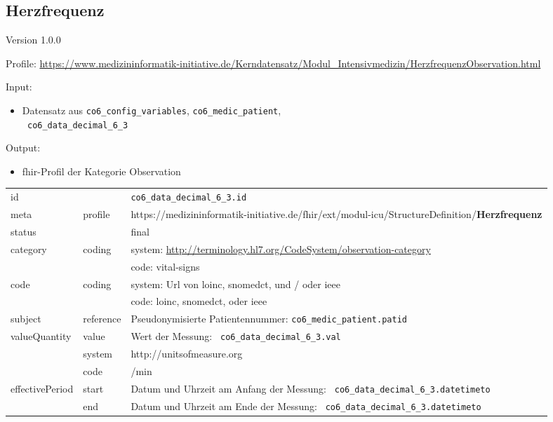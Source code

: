 \subsection{Herzfrequenz} 
\noindent Version 1.0.0

\noindent Profile: \url{https://www.medizininformatik-initiative.de/Kerndatensatz/Modul_Intensivmedizin/HerzfrequenzObservation.html}

\noindent Input:
\begin{itemize}
	\item Datensatz aus \texttt{co6\_config\_variables}, \texttt{co6\_medic\_patient}, \\ \texttt{
co6\_data\_decimal\_6\_3}
\end{itemize}
Output:
\begin{itemize}
        \item \ac{fhir}-Profil der Kategorie \glqq Observation\grqq{}
\end{itemize}
\begin{longtable}{|l|l|p{7.5cm}|}
        \hline
        \rowcolor{lightgray} \multicolumn{3}{|l|}{Data Mapping (inhaltlich)} \\ \hline
        id &  & \texttt{co6\_data\_decimal\_6\_3.id} \\ \hline
	meta & profile & https://medizininformatik-initiative.de/fhir/ext/modul-icu/StructureDefinition/\textbf{Herzfrequenz} \\ \hline 
	status &  & final  \\ \hline 
	category & coding & system: \url{http://terminology.hl7.org/CodeSystem/observation-category} \\
\cline{3-3}
	& & code: vital-signs\\ \hline
	code & coding & system: Url von \ac{loinc}, \ac{snomedct}, und / oder \ac{ieee} \\ 
	\cline{3-3} 
	 &  & code: \ac{loinc}, \ac{snomedct}, oder \ac{ieee} \\ \hline
	subject & reference & Pseudonymisierte Patientennummer: \texttt{co6\_medic\_patient.patid} \\ \hline
	valueQuantity & value & Wert der Messung: \texttt{
co6\_data\_decimal\_6\_3.val} \\
        \cline{2-3}
         & system & http://unitsofmeasure.org \\
         \cline{2-3}
         & code & /min \\ \hline
    effectivePeriod & start & Datum und Uhrzeit am Anfang der Messung: \texttt{
co6\_data\_decimal\_6\_3.datetimeto} \\
    \cline{2-3}
     & end & Datum und Uhrzeit am Ende der Messung: \texttt{
co6\_data\_decimal\_6\_3.datetimeto} \\ \hline
\end{longtable}


